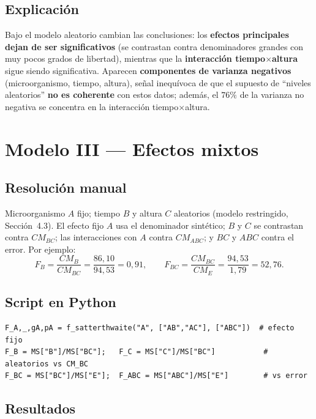 \documentclass[12pt,a4paper]{article}
\begin{document}
\subsection{Explicación}

Bajo el modelo aleatorio cambian las conclusiones: los \textbf{efectos principales dejan de ser significativos} (se contrastan contra denominadores grandes con muy pocos grados de libertad), mientras que la \textbf{interacción tiempo$\times$altura} sigue siendo significativa. Aparecen \textbf{componentes de varianza negativos} (microorganismo, tiempo, altura), señal inequívoca de que el supuesto de ``niveles aleatorios'' \textbf{no es coherente} con estos datos; además, el $76\%$ de la varianza no negativa se concentra en la interacción tiempo$\times$altura.

\section{Modelo III --- Efectos mixtos}

\subsection{Resolución manual}

Microorganismo $A$ fijo; tiempo $B$ y altura $C$ aleatorios (modelo restringido, Sección~4.3). El efecto fijo $A$ usa el denominador sintético; $B$ y $C$ se contrastan contra $CM_{BC}$; las interacciones con $A$ contra $CM_{ABC}$; y $BC$ y $ABC$ contra el error. Por ejemplo:
\[
F_B=\frac{CM_B}{CM_{BC}}=\frac{86{,}10}{94{,}53}=0{,}91,\qquad
F_{BC}=\frac{CM_{BC}}{CM_E}=\frac{94{,}53}{1{,}79}=52{,}76 .
\]

\subsection{Script en Python}

\begin{lstlisting}[caption={Pruebas F del modelo mixto restringido (A fijo; B, C aleatorios).}]
F_A,_,gA,pA = f_satterthwaite("A", ["AB","AC"], ["ABC"])  # efecto fijo
F_B = MS["B"]/MS["BC"];   F_C = MS["C"]/MS["BC"]           # aleatorios vs CM_BC
F_BC = MS["BC"]/MS["E"];  F_ABC = MS["ABC"]/MS["E"]        # vs error
\end{lstlisting}

\subsection{Resultados}
\end{document}
